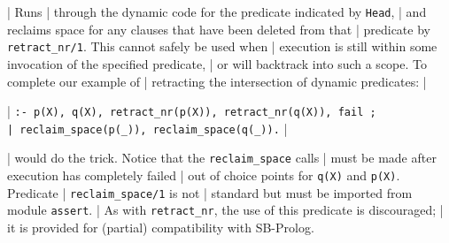 \begin{description}
{%

|  Runs
| through the dynamic code for the predicate indicated by {\tt Head},
| and reclaims space for any clauses that have been deleted from that
| predicate by {\tt retract\_nr/1}.  This cannot safely be used when
| execution is still within some invocation of the specified predicate,
| or will backtrack into such a scope.  To complete our example of
| retracting the intersection of dynamic predicates:
| \begin{center}
| {\tt :- p(X), q(X), retract\_nr(p(X)), retract\_nr(q(X)), fail\ ;\\
|      reclaim\_space(p(\_)), reclaim\_space(q(\_)).}
| \end{center}
| would do the trick. Notice that the {\tt reclaim\_space} calls 
| must be made after execution has completely failed
| out of choice points for {\tt q(X)} and {\tt p(X)}.  Predicate 
| {\tt reclaim\_space/1} is not
| standard but must be imported from module {\tt assert}.
| As with {\tt retract\_nr}, the use of this predicate is discouraged; 
| it is provided for (partial) compatibility with SB-Prolog.
}
\end{description}
